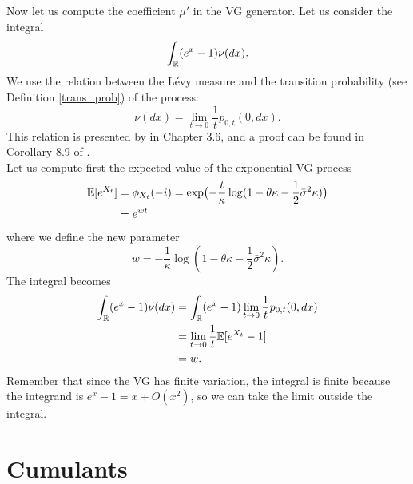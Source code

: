 Now let us compute the coefficient $\mu'$ in the VG generator. Let us consider the integral
$$ \int_{\mathbb{R}} (e^x-1) \nu(dx). $$
We use the relation between the Lévy measure and the transition probability (see Definition \ref{trans_prob}) of the process:
\begin{equation}
 \nu(dx) = \lim_{t\to 0} \frac{1}{t} p_{0,t}(0,dx) .
\end{equation}
This relation is presented by \cite{Cont} in Chapter 3.6, and a proof can be found in Corollary 8.9 of \cite{Sato}. \\
Let us compute first the expected value of the exponential VG process
\begin{align*}
\mathbb{E}[ e^{X_t}] &= \phi_{X_t}(-i) = \exp \bigl( -\frac{t}{\kappa} \log(1-\theta \kappa -\frac{1}{2}\bar\sigma^2 \kappa ) \bigr)\\
 &= e^{w t}
\end{align*}
where we define the new parameter 
\begin{equation}
 w = - \frac{1}{\kappa} \log(1-\theta \kappa -\frac{1}{2}\bar\sigma^2 \kappa).
\end{equation}
The integral becomes
\begin{align*}
 \int_{\mathbb{R}} (e^x-1) \nu(dx) &= \int_{\mathbb{R}} (e^x-1) \lim_{t\to 0} \frac{1}{t} p_{0,t}(0,dx) \\ 
         &= \lim_{t\to 0} \frac{1}{t} \mathbb{E}[ e^{X_t} - 1 ] \\
         &= w.
\end{align*}
Remember that since the VG has finite variation, the integral is finite because the integrand is $e^x-1 = x + O(x^2)$,
so we can take the limit outside the integral.\\





\section{Cumulants}\label{cumulant_sec}

